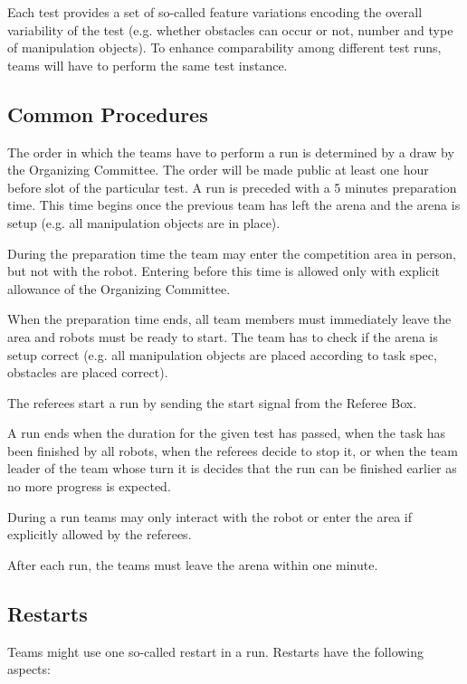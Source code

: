 Each test provides a set of so-called feature variations encoding the overall variability of the test (e.g. whether obstacles can occur or not, number and type of manipulation objects). To enhance comparability among different test runs, teams will have to perform the same test instance. 


\subsection{Common Procedures} 
The order in which the teams have to perform a run is determined by a draw by the Organizing Committee. The order will be made public at least one hour before slot of the particular test. A run is preceded with a 5 minutes preparation time. This time begins once the previous team has left the arena and the arena is setup (e.g. all manipulation objects are in place).
\par
During the preparation time the team may enter the competition area in person, but not with the robot. Entering before this time is allowed only with explicit allowance of the Organizing Committee. 
\par
When the preparation time ends, all team members must immediately leave the area and
robots must be ready to start. The team has to check if the arena is setup correct (e.g. all manipulation objects are placed according to task spec, obstacles are placed correct).
\par
The referees start a run by sending the start signal from the Referee Box.
\par
A run ends when the duration for the given test has passed, when the task has been finished by all robots, when the referees decide to stop it, or when the team leader of the team whose turn it is decides that the run can be finished earlier as no more progress is expected.
\par
During a run teams may only interact with the robot or enter the area if explicitly allowed by the referees. 
\par
After each run, the teams must leave the arena within one minute.

\subsection{Restarts}
Teams might use one so-called restart in a run. Restarts have the following aspects:

